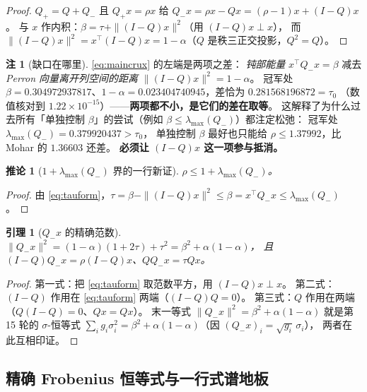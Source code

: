 \documentclass[UTF8,11pt]{ctexart}
\newtheorem{lemma}[theorem]{引理}
\newtheorem{corollary}[theorem]{推论}
\theoremstyle{definition}
\newtheorem{remark}[theorem]{注}
\begin{document}
\begin{proof}
$Q_+=Q+Q_-$ 且 $Q_+x=\rho x$ 给 $Q_-x=\rho x-Qx=(\rho-1)x+(I-Q)x$。
与 $x$ 作内积：$\beta=\tau+\|(I-Q)x\|^2$（用 $(I-Q)x\perp x$），
而 $\|(I-Q)x\|^2=x^\top(I-Q)x=1-\alpha$（$Q$ 是秩三正交投影，$Q^2=Q$）。
\end{proof}

\begin{remark}[缺口在哪里]\label{rmk:taugap}
\eqref{eq:maincrux} 的左端是两项之差：
\emph{钝部能量} $x^\top Q_-x=\beta$ 减去 \emph{Perron 向量离开列空间的距离} $\|(I-Q)x\|^2=1-\alpha$。
冠军处 $\beta=0.304972937817$、$1-\alpha=0.023404740945$，差恰为 $0.281568196872=\tau_0$
（数值核对到 $1.22\times10^{-15}$）——\textbf{两项都不小，是它们的差在取等}。
这解释了为什么过去所有「单独控制 $\beta$」的尝试（例如 $\beta\le\lambda_{\max}(Q_-)$）都注定松弛：
冠军处 $\lambda_{\max}(Q_-)=0.379920437>\tau_0$，
单独控制 $\beta$ 最好也只能给 $\rho\le1.37992$，比 Mohar 的 $1.36603$ 还差。
\textbf{必须让 $(I-Q)x$ 这一项参与抵消。}
\end{remark}

\begin{corollary}[$1+\lambda_{\max}(Q_-)$ 界的一行新证]\label{cor:oneneg}
$\rho\le1+\lambda_{\max}(Q_-)$。
\end{corollary}

\begin{proof}
由 \eqref{eq:tauform}，$\tau=\beta-\|(I-Q)x\|^2\le\beta=x^\top Q_-x\le\lambda_{\max}(Q_-)$。
\end{proof}

\begin{lemma}[$Q_-x$ 的精确范数]\label{lem:normqmx}
$\|Q_-x\|^2=(1-\alpha)(1+2\tau)+\tau^2=\beta^2+\alpha(1-\alpha)$，
且 $(I-Q)Q_-x=\rho(I-Q)x$、$QQ_-x=\tau Qx$。
\end{lemma}

\begin{proof}
第一式：把 \eqref{eq:tauform} 取范数平方，用 $(I-Q)x\perp x$。
第二式：$(I-Q)$ 作用在 \eqref{eq:tauform} 两端（$(I-Q)Q=0$）。
第三式：$Q$ 作用在两端（$Q(I-Q)=0$、$Qx=Qx$）。
末一等式 $\|Q_-x\|^2=\beta^2+\alpha(1-\alpha)$ 就是第 15 轮的 $\sigma$-恒等式
$\sum_ig_i\sigma_i^2=\beta^2+\alpha(1-\alpha)$（因 $(Q_-x)_i=\sqrt{g_i}\,\sigma_i$），
两者在此互相印证。
\end{proof}

\subsection{精确 Frobenius 恒等式与一行式谱地板}\label{sec:r17:frob}
\end{document}
